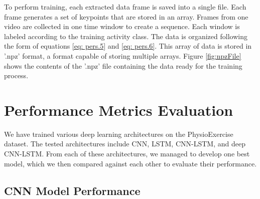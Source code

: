 To perform training, each extracted data frame is saved into a single file. Each frame generates a set of keypoints that are stored in an array. Frames from one video are collected in one time window to create a sequence. Each window is labeled according to the training activity class. The data is organized following the form of equations \ref{eq: pers.5} and \ref{eq: pers.6}. This array of data is stored in '.npz' format, a format capable of storing multiple arrays. Figure \ref{fig:npzFile} shows the contents of the '.npz' file containing the data ready for the training process.



\section{Performance Metrics Evaluation}
\label{sec4:evaluation}

We have trained various deep learning architectures on the PhysioExercise dataset. The tested architectures include CNN, LSTM, CNN-LSTM, and deep CNN-LSTM. From each of these architectures, we managed to develop one best model, which we then compared against each other to evaluate their performance.

\subsection{CNN Model Performance}
\label{subsec4:CNNPerformance}

